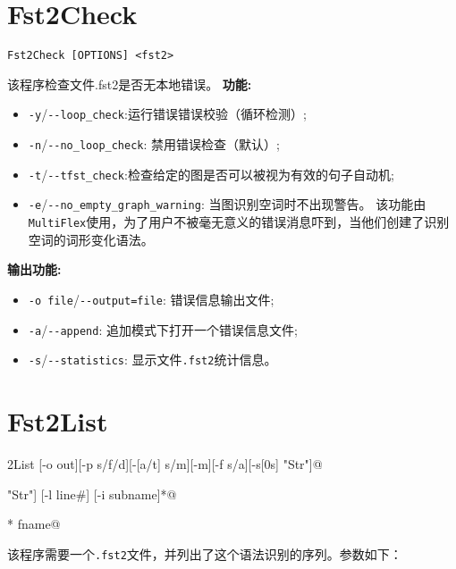 \section{Fst2Check}
\verb+Fst2Check [OPTIONS] <fst2>+

\bigskip
\noindent 该程序检查文件.fst2是否无本地错误。
\bigskip
\noindent \textbf{功能:}
\begin{itemize}
\item \verb+-y+/\verb+--loop_check+:运行错误错误校验（循环检测）;
\item \verb+-n+/\verb+--no_loop_check+: 禁用错误检查（默认）;
\item \verb+-t+/\verb+--tfst_check+:检查给定的图是否可以被视为有效的句子自动机;
\item \verb+-e+/\verb+--no_empty_graph_warning+: 当图识别空词时不出现警告。 该功能由 \verb+MultiFlex+使用，为了用户不被毫无意义的错误消息吓到，当他们创建了识别空词的词形变化语法。

\end{itemize}

\bigskip
\noindent \textbf{输出功能:}
\begin{itemize}
\item \verb+-o file+/\verb+--output=file+: 错误信息输出文件;
\item \verb+-a+/\verb+--append+: 追加模式下打开一个错误信息文件;
\item \verb+-s+/\verb+--statistics+: 显示文件\verb+.fst2+统计信息。
\end{itemize}








\section{Fst2List}
\verb@Fst2List [-o out][-p s/f/d][-[a/t] s/m][-m][-f s/a][-s[0s] "Str"]@

\verb@         [-r[s/l] "Str"] [-l line#] [-i subname]*@

\verb@         [-c SS=0xxxx]* fname@

\bigskip
\noindent 该程序需要一个\verb+.fst2+文件，并列出了这个语法识别的序列。参数如下：


